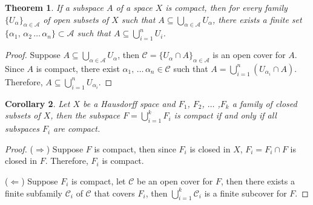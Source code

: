 \documentclass[12pt,oneside,english]{amsbook}
\numberwithin{equation}{section} %
\numberwithin{figure}{section} %
\theoremstyle{plain}
\numberwithin{section}{chapter}
\newtheorem{thm}{Theorem}[section]
\theoremstyle{plain}
\newtheorem{corollary}[thm]{Corollary}
\begin{document}
\begin{thm}
  If a subspace $A$ of a space $X$ is compact, then for every family $\{U_{\alpha}\}_{\alpha  \in  \mathcal{A}}$ of open subsets of $X$ such that $A  \subseteq  \bigcup_{\alpha  \in  \mathcal{A}}U_{\alpha}$, there exists a finite set $\{ \alpha_{1}, \, \alpha_{2} \, \ldots \, \alpha_{n} \}  \subset \mathcal{A}$ such that $A  \subseteq  \bigcup_{i  =  1}^{n}U_{i}$. 
\end{thm}

\begin{proof}
  Suppose $A  \subseteq  \bigcup_{\alpha  \in  \mathcal{A}}U_{\alpha}$, then $\mathcal{C}  =  \{U_{\alpha} \cap A\}_{\alpha  \in  \mathcal{A}}$ is an open cover for $A$. Since $A$ is compact, there exist $\alpha_{1}, \, \ldots \, \alpha_{n} \in \mathcal{C}$ such that $A = \bigcup_{i  =  1}^{n}(U_{\alpha_{i}} \cap A)$. Therefore, $A  \subseteq  \bigcup_{i  =  1}^{n}U_{\alpha_{i}}$. 
\end{proof}

\begin{corollary}
  Let $X$ be a Hausdorff space and {$F_{1}$, $F_{2}$, $\ldots$ ,$F_{k}$} a family of closed subsets of $X$, then the subspace $F  =  \bigcup_{i  =  1}^{k}F_{i}$ is compact if and only if  all subspaces $F_{i}$ are compact. 
\end{corollary}
\begin{proof}
  ($\Rightarrow$) Suppose $F$ is compact, then since $F_{i}$ is closed in $X$, $F_{i}  =  F_{i} \cap F$ is closed in $F$. Therefore, $F_{i}$ is compact.

  ($\Leftarrow$) Suppose $F_{i}$ is compact, let $\mathcal{C}$ be an open cover for $F$, then there exists a finite subfamily $\mathcal{C}_{i}$ of $\mathcal{C}$ that covers $F_{i}$, then $\bigcup_{i  =  1}^{k} \mathcal{C}_{i}$ is a finite subcover for $F$.
\end{proof}
\end{document}
